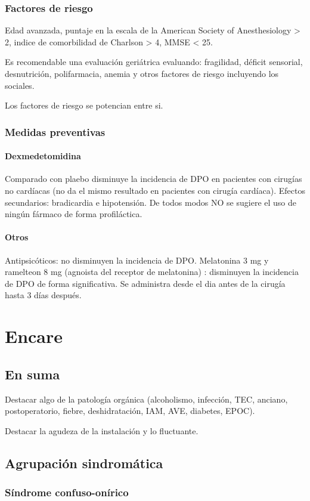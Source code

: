 \documentclass{scrbook}
\begin{document}
\subsubsection*{Factores de riesgo}
Edad avanzada, puntaje en la escala de la American Society of Anesthesiology > 2, indice de comorbilidad de Charlson > 4, MMSE < 25.

Es recomendable una evaluación geriátrica evaluando: fragilidad, déficit sensorial, desnutrición, polifarmacia, anemia y otros factores de riesgo incluyendo los sociales.

Los factores de riesgo se potencian entre si.
\subsubsection*{Medidas preventivas}
\paragraph{Dexmedetomidina}
Comparado con plaebo disminuye la incidencia de DPO en pacientes con cirugías no cardíacas (no da el mismo resultado en pacientes con cirugía cardíaca). Efectos secundarios: bradicardia e hipotensión.
De todos modos NO se sugiere el uso de ningún fármaco de forma profiláctica.
\paragraph{Otros}
Antipsicóticos: no disminuyen la incidencia de DPO. Melatonina 3 mg y ramelteon 8 mg (agnoista del receptor de melatonina) : disminuyen la incidencia de DPO de forma significativa. Se administra desde el dia antes de la cirugía hasta 3 días después.
\section*{Encare}
\subsection*{En suma}
Destacar algo de la patología orgánica (alcoholismo, infección, TEC, anciano, postoperatorio, fiebre, deshidratación, IAM, AVE, diabetes, EPOC).

Destacar la agudeza de la instalación y lo fluctuante.

\subsection*{Agrupación sindromática}
\subsubsection*{Síndrome confuso-onírico}
\end{document}
